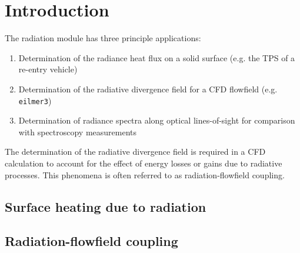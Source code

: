 \chapter{Introduction}

The radiation module has three principle applications:

\begin{enumerate}
 \item Determination of the radiance heat flux on a solid surface (e.g. the TPS of a re-entry vehicle)
 \item Determination of the radiative divergence field for a CFD flowfield (e.g. \texttt{eilmer3})
 \item Determination of radiance spectra along optical lines-of-sight for comparison with spectroscopy measurements
\end{enumerate}

The determination of the radiative divergence field is required in a CFD calculation to account for the effect of energy losses or gains due to radiative processes.
This phenomena is often referred to as radiation-flowfield coupling.  

\section{Surface heating due to radiation}



\section{Radiation-flowfield coupling}

